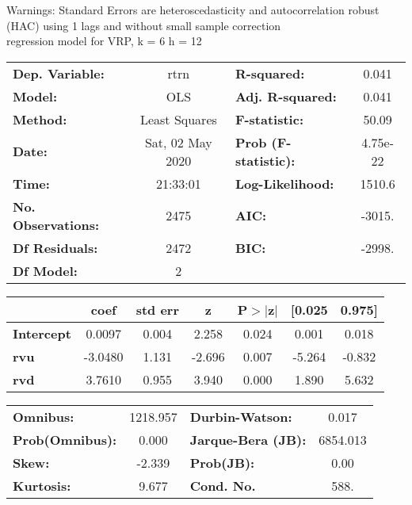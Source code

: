 Warnings: \newline
 [1] Standard Errors are heteroscedasticity and autocorrelation robust (HAC) using 1 lags and without small sample correction\\ 

regression model for VRP, k = 6 h = 12\begin{center}
\begin{tabular}{lclc}
\toprule
\textbf{Dep. Variable:}    &       rtrn       & \textbf{  R-squared:         } &     0.041   \\
\textbf{Model:}            &       OLS        & \textbf{  Adj. R-squared:    } &     0.041   \\
\textbf{Method:}           &  Least Squares   & \textbf{  F-statistic:       } &     50.09   \\
\textbf{Date:}             & Sat, 02 May 2020 & \textbf{  Prob (F-statistic):} &  4.75e-22   \\
\textbf{Time:}             &     21:33:01     & \textbf{  Log-Likelihood:    } &    1510.6   \\
\textbf{No. Observations:} &        2475      & \textbf{  AIC:               } &    -3015.   \\
\textbf{Df Residuals:}     &        2472      & \textbf{  BIC:               } &    -2998.   \\
\textbf{Df Model:}         &           2      & \textbf{                     } &             \\
\bottomrule
\end{tabular}
\begin{tabular}{lcccccc}
                   & \textbf{coef} & \textbf{std err} & \textbf{z} & \textbf{P$> |$z$|$} & \textbf{[0.025} & \textbf{0.975]}  \\
\midrule
\textbf{Intercept} &       0.0097  &        0.004     &     2.258  &         0.024        &        0.001    &        0.018     \\
\textbf{rvu}       &      -3.0480  &        1.131     &    -2.696  &         0.007        &       -5.264    &       -0.832     \\
\textbf{rvd}       &       3.7610  &        0.955     &     3.940  &         0.000        &        1.890    &        5.632     \\
\bottomrule
\end{tabular}
\begin{tabular}{lclc}
\textbf{Omnibus:}       & 1218.957 & \textbf{  Durbin-Watson:     } &    0.017  \\
\textbf{Prob(Omnibus):} &   0.000  & \textbf{  Jarque-Bera (JB):  } & 6854.013  \\
\textbf{Skew:}          &  -2.339  & \textbf{  Prob(JB):          } &     0.00  \\
\textbf{Kurtosis:}      &   9.677  & \textbf{  Cond. No.          } &     588.  \\
\bottomrule
\end{tabular}
\end{center}

